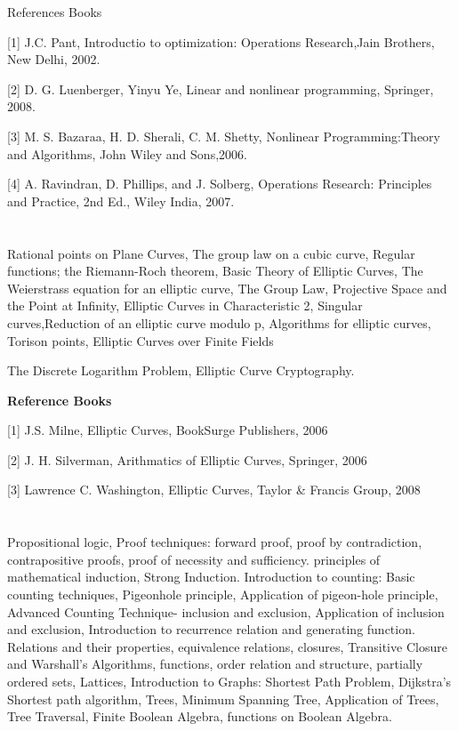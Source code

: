 References Books  

[1] J.C. Pant, Introductio to optimization: Operations Research,Jain Brothers, New Delhi, 2002. 

[2] D. G. Luenberger, Yinyu Ye, Linear and nonlinear programming, Springer, 2008. 

[3] M. S. Bazaraa, H. D. Sherali, C. M. Shetty, Nonlinear Programming:Theory and Algorithms, John Wiley and Sons,2006. 

[4] A. Ravindran, D. Phillips, and J. Solberg, Operations Research: Principles and Practice, 2nd Ed., Wiley India, 2007. 

 

\section{\dsccourseinfo}

Rational points on Plane Curves, The group law on a cubic curve, Regular functions; the Riemann-Roch theorem, Basic Theory of Elliptic Curves, The Weierstrass equation for an elliptic curve, The Group Law, Projective Space and the Point at Infinity, Elliptic Curves in Characteristic 2, Singular curves,Reduction of an elliptic curve modulo p, Algorithms for elliptic curves, Torison points, Elliptic Curves over Finite Fields 

The Discrete Logarithm Problem, Elliptic Curve Cryptography. 

 

 \textbf{Reference Books} 

[1] J.S. Milne, Elliptic Curves, BookSurge Publishers, 2006 

[2] J. H. Silverman, Arithmatics of Elliptic Curves, Springer, 2006 

[3] Lawrence C. Washington, Elliptic Curves, Taylor \& Francis Group, 2008 

 
\section{\dsccourseinfo}

 Propositional logic, Proof techniques: forward proof, proof by contradiction, contrapositive proofs, proof of necessity and sufficiency. principles of mathematical induction, Strong Induction. Introduction to counting: Basic counting techniques, Pigeonhole principle, Application of pigeon-hole principle, Advanced Counting Technique- inclusion and exclusion, Application of inclusion and exclusion, Introduction to recurrence relation and generating function. Relations and their properties, equivalence relations, closures, Transitive Closure and Warshall’s Algorithms, functions, order relation and structure, partially ordered sets, Lattices, Introduction to Graphs: Shortest Path Problem, Dijkstra’s Shortest path algorithm, Trees, Minimum Spanning Tree, Application of Trees, Tree Traversal, Finite Boolean Algebra, functions on Boolean Algebra.   

